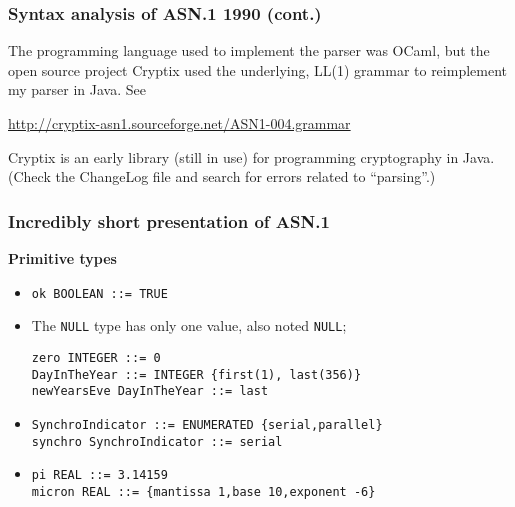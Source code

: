\documentclass[compress,dvips,xcolor={dvipsnames},t]{beamer}
\newcommand\ASN{\textsf{ASN.1}\xspace}
\begin{document}
\begin{frame}
\frametitle{Syntax analysis of \ASN 1990 (cont.)}

The programming language used to implement the parser was OCaml, but
the open source project Cryptix used the underlying, LL(1) grammar to
reimplement my parser in Java. See

\medskip

{\small\url{http://cryptix-asn1.sourceforge.net/ASN1-004.grammar}}

\medskip

Cryptix is an early library (still in use) for programming
cryptography in Java. (Check the ChangeLog file and search for errors
related to ``parsing''.)

\end{frame}

\begin{frame}[containsverbatim]
\frametitle{Incredibly short presentation of \ASN}

\noindent
\textbf{Primitive types}
\begin{itemize}

  \item \verb+ok BOOLEAN ::= TRUE+

  \item The \texttt{NULL} type has only one value, also noted
        \texttt{NULL};

\begin{verbatim}
zero INTEGER ::= 0
DayInTheYear ::= INTEGER {first(1), last(356)}
newYearsEve DayInTheYear ::= last
\end{verbatim}

  \item
\begin{verbatim}
SynchroIndicator ::= ENUMERATED {serial,parallel}
synchro SynchroIndicator ::= serial
\end{verbatim}

  \item

\begin{verbatim}
pi REAL ::= 3.14159
micron REAL ::= {mantissa 1,base 10,exponent -6}
\end{verbatim}

\end{itemize}

\end{frame}
\end{document}
